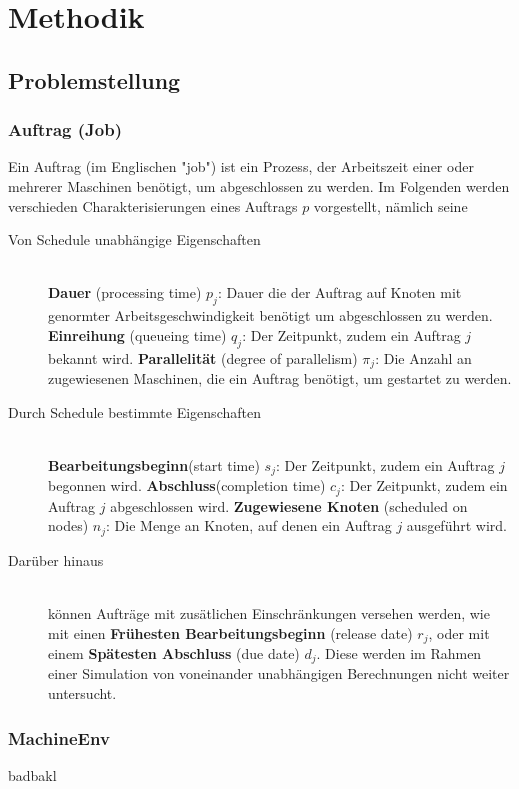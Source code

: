 \chapter{Methodik}
\label{chap:ein}
\section{Problemstellung}

\subsection{Auftrag (Job)}
Ein Auftrag (im Englischen "job") ist ein Prozess, der Arbeitszeit einer oder mehrerer Maschinen benötigt, um abgeschlossen zu werden. Im Folgenden werden verschieden Charakterisierungen eines Auftrags $p$ vorgestellt, nämlich seine

\begin{description}
\item[Von Schedule unabhängige Eigenschaften] \hfil \\
\textbf{Dauer} (processing time) $p_j$: Dauer die der Auftrag auf Knoten mit genormter Arbeitsgeschwindigkeit benötigt um abgeschlossen zu werden.
\textbf{Einreihung} (queueing time) $q_j$: Der Zeitpunkt, zudem ein Auftrag $j$ bekannt wird.
\textbf{Parallelität} (degree of parallelism) $\pi_j$: Die Anzahl an zugewiesenen Maschinen, die ein Auftrag benötigt, um gestartet zu werden.
\item[Durch Schedule bestimmte Eigenschaften]\hfill \\ 
\textbf{Bearbeitungsbeginn}(start time) $s_j$: Der Zeitpunkt, zudem ein Auftrag $j$ begonnen wird. 
\textbf{Abschluss}(completion time) $c_j$: Der Zeitpunkt, zudem ein Auftrag $j$ abgeschlossen wird.
\textbf{Zugewiesene Knoten} (scheduled on nodes) $n_j$: Die Menge an Knoten, auf denen ein Auftrag $j$ ausgeführt wird.

\item[Darüber hinaus] \hfil \\
können Aufträge mit zusätlichen Einschränkungen versehen werden, wie mit einen \textbf{Frühesten Bearbeitungsbeginn} (release date) $r_j$, oder mit einem \textbf{Spätesten Abschluss} (due date) $d_j$. Diese werden im Rahmen einer Simulation von voneinander unabhängigen Berechnungen nicht weiter untersucht.
\end{description}

\subsection{MachineEnv}
badbakl

